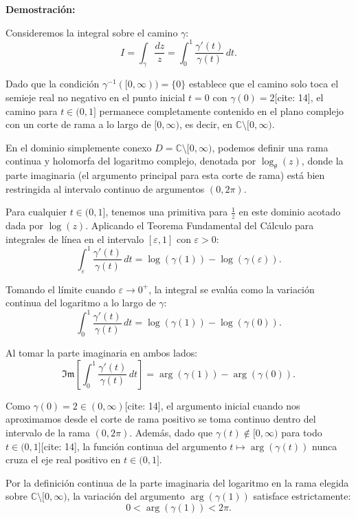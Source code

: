 \documentclass[11pt,a4paper]{article}
\theoremstyle{definition}
\theoremstyle{plain}
\theoremstyle{remark}
\begin{document}
	\vspace{1em}
	\noindent \textbf{Demostración:}
	
	Consideremos la integral sobre el camino $\gamma$:
	\[
	I = \int_{\gamma} \frac{dz}{z} = \int_0^1 \frac{\gamma'(t)}{\gamma(t)} \, dt.
	\]
	
	Dado que la condición $\gamma^{-1}([0, \infty)) = \{0\}$ establece que el camino solo toca el semieje real no negativo en el punto inicial $t = 0$ con $\gamma(0) = 2$[cite: 14], el camino para $t \in (0, 1]$ permanece completamente contenido en el plano complejo con un corte de rama a lo largo de $[0, \infty)$, es decir, en $\mathbb{C} \setminus [0, \infty)$.
	
	En el dominio simplemente conexo $D = \mathbb{C} \setminus [0, \infty)$, podemos definir una rama continua y holomorfa del logaritmo complejo, denotada por $\log_{\theta}(z)$, donde la parte imaginaria (el argumento principal para esta corte de rama) está bien restringida al intervalo continuo de argumentos $(0, 2\pi)$.
	
	Para cualquier $t \in (0, 1]$, tenemos una primitiva para $\frac{1}{z}$ en este dominio acotado dada por $\log(z)$. Aplicando el Teorema Fundamental del Cálculo para integrales de línea en el intervalo $[\varepsilon, 1]$ con $\varepsilon > 0$:
	\[
	\int_{\varepsilon}^1 \frac{\gamma'(t)}{\gamma(t)} \, dt = \log(\gamma(1)) - \log(\gamma(\varepsilon)).
	\]
	
	Tomando el límite cuando $\varepsilon \to 0^+$, la integral se evalúa como la variación continua del logaritmo a lo largo de $\gamma$:
	\[
	\int_0^1 \frac{\gamma'(t)}{\gamma(t)} \, dt = \log(\gamma(1)) - \log(\gamma(0)).
	\]
	
	Al tomar la parte imaginaria en ambos lados:
	\[
	\mathfrak{Im} \left[ \int_0^1 \frac{\gamma'(t)}{\gamma(t)} \, dt \right] = \arg(\gamma(1)) - \arg(\gamma(0)).
	\]
	
	Como $\gamma(0) = 2 \in (0, \infty)$[cite: 14], el argumento inicial cuando nos aproximamos desde el corte de rama positivo se toma continuo dentro del intervalo de la rama $(0, 2\pi)$. Además, dado que $\gamma(t) \notin [0, \infty)$ para todo $t \in (0, 1]$[cite: 14], la función continua del argumento $t \mapsto \arg(\gamma(t))$ nunca cruza el eje real positivo en $t \in (0, 1]$.
	
	Por la definición continua de la parte imaginaria del logaritmo en la rama elegida sobre $\mathbb{C} \setminus [0, \infty)$, la variación del argumento $\arg(\gamma(1))$ satisface estrictamente:
	\[
	0 < \arg(\gamma(1)) < 2\pi.
	\]
	
\end{document}
